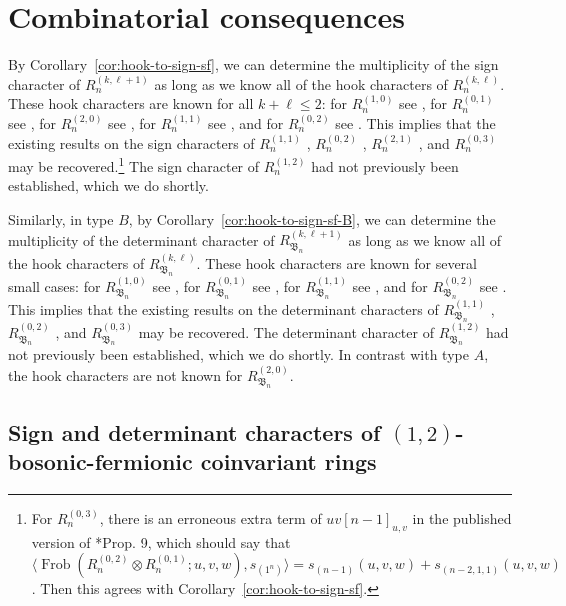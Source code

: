 \documentclass[11pt, reqno]{amsart}
\theoremstyle{definition}
\theoremstyle{remark}
\numberwithin{equation}{section}
\newcommand{\0}{\emptyset}
\DeclareMathOperator{\Frob}{Frob}
\begin{document}
\section{Combinatorial consequences}\label{sec:consequences}

By Corollary~\ref{cor:hook-to-sign-sf}, we can determine the multiplicity of the sign character of $R_n^{(k,\ell+1)}$ as long as we know all of the hook characters of $R_n^{(k,\ell)}$. These hook characters are known for all $k+\ell \leq 2$: for $R_n^{(1,0)}$ see \cite{stanley-invariants-finite-groups}, for $R_n^{(0,1)}$ see \cite{HaglundSergel}, for $R_n^{(2,0)}$ see \cites{Haglund2008,Haglund2004,Alfano,Haiman2002}, for $R_n^{(1,1)}$ see \cite{MuraiRhoadesWilson}, and for $R_n^{(0,2)}$ see \cite{KimRhoades2022}.  
This implies that the existing results on the sign characters of $R_n^{(1,1)}$ \cite{SwansonWallach1}, $R_n^{(0,2)}$ \cite{KimRhoades2022}, $R_n^{(2,1)}$ \cite{GLM}, and $R_n^{(0,3)}$ \cite{Lentfer2025} may be recovered.\footnote{For $R_n^{(0,3)}$, there is an erroneous extra term of $uv[n-1]_{u,v}$ in the published version of \cite{Lentfer2025}*{Prop. 9}, which should say that $\langle \Frob(R_n^{(0,2)} \otimes R_n^{(0,1)};u,v,w),s_{(1^n)} \rangle = s_{(n-1)}(u,v,w) + s_{(n-2,1,1)}(u,v,w)$. Then this agrees with Corollary~\ref{cor:hook-to-sign-sf}.}  
The sign character of $R_n^{(1,2)}$ had not previously been established, which we do shortly.

Similarly, in type $B$, by Corollary~\ref{cor:hook-to-sign-sf-B}, we can determine the multiplicity of the determinant character of $R_{\mathfrak{B}_n}^{(k,\ell+1)}$ as long as we know all of the hook characters of $R_{\mathfrak{B}_n}^{(k,\ell)}$.
These hook characters are known for several small cases: for $R_{\mathfrak{B}_n}^{(1,0)}$ see \cite{Stembridge}, for $R_{\mathfrak{B}_n}^{(0,1)}$ see \cite{JiangLentfer}, for $R_{\mathfrak{B}_n}^{(1,1)}$ see \cites{BR, BCJLR}, and for $R_{\mathfrak{B}_n}^{(0,2)}$ see \cites{KimRhoades2022, JiangLentfer}. 
This implies that the existing results on the determinant characters of $R_{\mathfrak{B}_n}^{(1,1)}$ \cite{SwansonWallach1}, $R_{\mathfrak{B}_n}^{(0,2)}$ \cite{KimRhoades2022}, and $R_{\mathfrak{B}_n}^{(0,3)}$ \cite{JiangLentfer} may be recovered. 
The determinant character of $R_{\mathfrak{B}_n}^{(1,2)}$ had not previously been established, which we do shortly.
In contrast with type $A$, the hook characters are not known for $R_{\mathfrak{B}_n}^{(2,0)}$.

\subsection{Sign and determinant characters of \texorpdfstring{$(1,2)$}{(1,2)}-bosonic-fermionic coinvariant rings}\label{subsec:sign-1-2}
\end{document}
